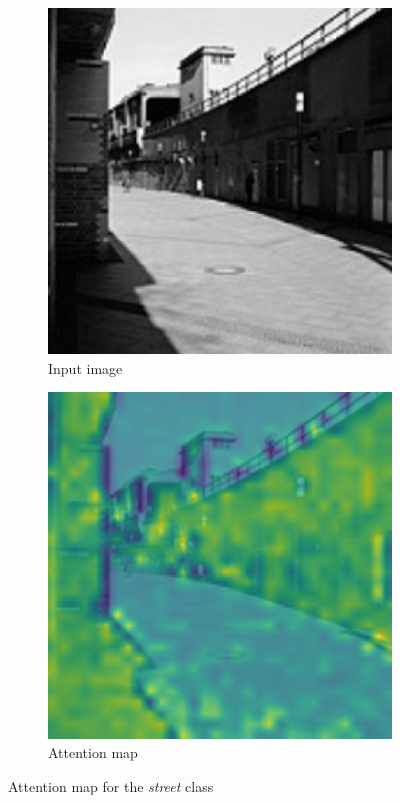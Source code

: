 \documentclass[twocolumn,superscriptaddress,aps]{revtex4-1}
\begin{document}
\begin{figure}[H]
    \centering
    \begin{subfigure}{0.235 \textwidth}
        \includegraphics[width=\textwidth]{images/img_attn_street.png}
        \caption{Input image}
    \end{subfigure}
    \begin{subfigure}{0.235 \textwidth}
        \includegraphics[width=\textwidth]{images/map_attn_street.png}
        \caption{Attention map}
    \end{subfigure}
    \caption{Attention map for the \textit{street} class}
    \label{fig:attent_map1}
\end{figure}
\end{document}
